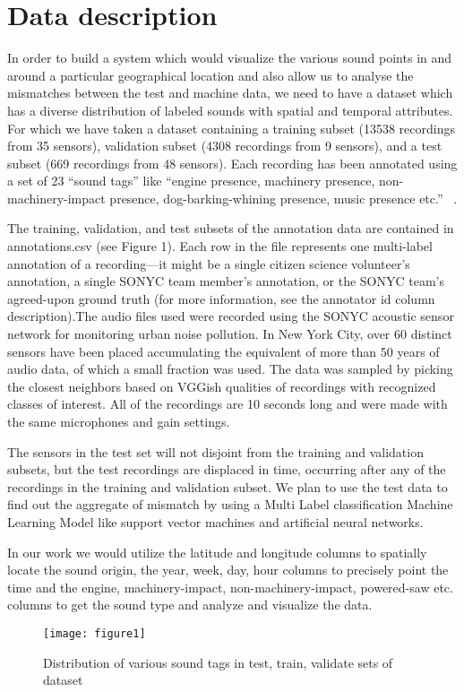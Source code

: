 \section{Data description}
In order to build a system which would visualize the various sound points in and around a particular geographical location and also allow us to analyse the mismatches between the test and machine data, we need to have a dataset which has a diverse distribution of labeled sounds with spatial and temporal attributes. For which we have taken a dataset containing a training subset (13538 recordings from 35 sensors), validation subset (4308 recordings from 9 sensors), and a test subset (669 recordings from 48 sensors). Each recording has been annotated using a set of 23 “sound tags” like “engine presence, machinery presence, non-machinery-impact presence, dog-barking-whining presence, music presence etc.”  ~\cite{4}.

The training, validation, and test subsets of the annotation data are contained in annotations.csv (see Figure 1). Each row in the file represents one multi-label annotation of a recording—it might be a single citizen science volunteer's annotation, a single SONYC team member's annotation, or the SONYC team's agreed-upon ground truth (for more information, see the annotator id column description).The audio files used were recorded using the SONYC acoustic sensor network for monitoring urban noise pollution. In New York City, over 60 distinct sensors have been placed accumulating the equivalent of more than 50 years of audio data, of which a small fraction was used. The data was sampled by picking the closest neighbors based on VGGish qualities of recordings with recognized classes of interest. All of the recordings are 10 seconds long and were made with the same microphones and gain settings. 

The sensors in the test set will not disjoint from the training and validation subsets, but the test recordings are displaced in time, occurring after any of the recordings in the training and validation subset. We plan to use the test data to find out the aggregate of mismatch by using a Multi Label classification Machine Learning Model like support vector machines and artificial neural networks.

In our work we would utilize the latitude and longitude columns to spatially locate the sound origin, the year, week, day, hour columns to precisely point the time and the engine, machinery-impact, non-machinery-impact, powered-saw etc. columns to get the sound type and analyze and visualize the data.
	\begin{figure}[h!]
		\texttt{[image: figure1]}
		\caption{Distribution of various sound tags in test, train, validate sets of dataset}
	\end{figure}
	


	
	
	
	

	
	